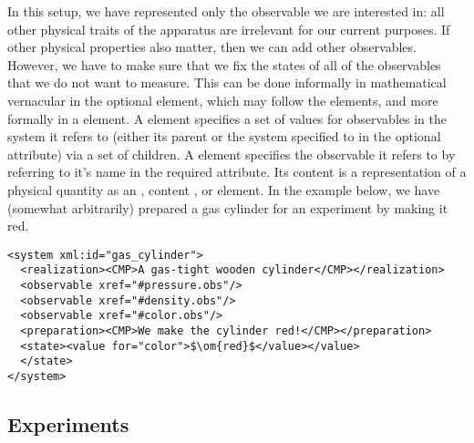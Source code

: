 In this setup, we have represented only the observable we are interested in: all other
physical traits of the apparatus are irrelevant for our current purposes. If other
physical properties also matter, then we can add other observables. However, we have to
make sure that we fix the states of all of the observables that we do not want to
measure. This can be done informally in mathematical vernacular in the optional
{} element, which may follow the {} elements, and
more formally in a {} element. A {} element specifies a set of
values for observables in the system it refers to (either its parent {} or
the system specified to in the optional {} attribute) via a set of
{} children. A {} element specifies the observable it refers
to by referring to it's name in the required {} attribute. Its
content is a representation of a physical quantity as an {\openmath}, content {\mathml},
or {\omdoc} {} element. In the example below, we have (somewhat
arbitrarily) prepared a gas cylinder for an experiment by making it red.

\begin{lstlisting}[label=lst:system,mathescape,
  caption={A Physical System Prepared for an Experiment},
  index={theory,symbol}]
<system xml:id="gas_cylinder">
  <realization><CMP>A gas-tight wooden cylinder</CMP></realization>
  <observable xref="#pressure.obs"/>
  <observable xref="#density.obs"/>
  <observable xref="#color.obs"/>
  <preparation><CMP>We make the cylinder red!</CMP></preparation>
  <state><value for="color">$\om{red}$</value></value>
  </state>
</system>
\end{lstlisting}

\subsection{Experiments}\label{subsec:experiments}

